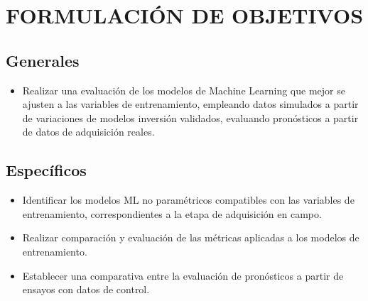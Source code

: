 \chapter{FORMULACIÓN DE OBJETIVOS}

\section{Generales}

\begin{itemize}

	\item Realizar una evaluación de los modelos de Machine Learning que mejor se ajusten a las variables de entrenamiento, empleando datos simulados a partir de variaciones de modelos inversión validados, evaluando pronósticos a partir de datos de adquisición reales.
	
\end{itemize}

\section{Específicos}


\begin{itemize}
	\item Identificar los modelos ML no paramétricos compatibles con las variables de entrenamiento, correspondientes a la etapa de adquisición en campo. %
	\item Realizar comparación y evaluación de las métricas aplicadas a los modelos de entrenamiento.
	\item Establecer una comparativa entre la evaluación de pronósticos a partir de ensayos con datos de control.
\end{itemize}
